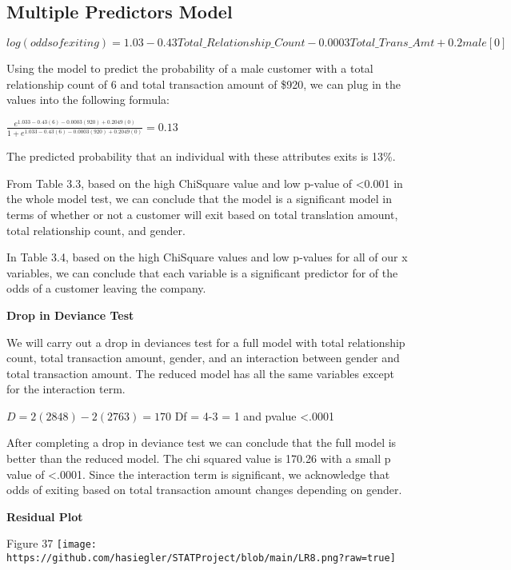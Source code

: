 \documentclass[
]{article}
\begin{document}
\hypertarget{multiple-predictors-model}{%
\subsection{Multiple Predictors Model}\label{multiple-predictors-model}}

\(log(odds of exiting) = 1.03 - 0.43 Total\_Relationship\_Count - 0.0003 Total\_Trans\_Amt + 0.2male[0]\)

Using the model to predict the probability of a male customer with a
total relationship count of 6 and total transaction amount of \$920, we
can plug in the values into the following formula:

\(\frac{e^{1.033 - 0.43(6) - 0.0003(920) + 0.2049(0)}}{1 + e^{1.033 - 0.43(6) - 0.0003(920) + 0.2049(0)}} = 0.13\)

The predicted probability that an individual with these attributes exits
is 13\%.

From Table 3.3, based on the high ChiSquare value and low p-value of
\textless0.001 in the whole model test, we can conclude that the model
is a significant model in terms of whether or not a customer will exit
based on total translation amount, total relationship count, and gender.

In Table 3.4, based on the high ChiSquare values and low p-values for
all of our x variables, we can conclude that each variable is a
significant predictor for of the odds of a customer leaving the company.

\textbf{Drop in Deviance Test}

We will carry out a drop in deviances test for a full model with total
relationship count, total transaction amount, gender, and an interaction
between gender and total transaction amount. The reduced model has all
the same variables except for the interaction term.

\(D = 2(2848) - 2(2763) = 170\) Df = 4-3 = 1 and pvalue \textless.0001

After completing a drop in deviance test we can conclude that the full
model is better than the reduced model. The chi squared value is 170.26
with a small p value of \textless.0001. Since the interaction term is
significant, we acknowledge that odds of exiting based on total
transaction amount changes depending on gender.

\textbf{Residual Plot}

Figure 37
\texttt{[image: https://github.com/hasiegler/STATProject/blob/main/LR8.png?raw=true]}
\end{document}
